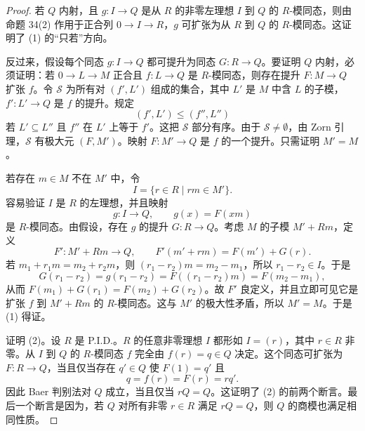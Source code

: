 \begin{proof}
若 $Q$ 内射，且 $g:I\to Q$ 是从 $R$ 的非零左理想 $I$ 到 $Q$ 的 $R$-模同态，则由命题 34(2) 作用于正合列 $0\to I\to R$，$g$ 可扩张为从 $R$ 到 $Q$ 的 $R$-模同态。这证明了 (1) 的“只若”方向。

反过来，假设每个同态 $g:I\to Q$ 都可提升为同态 $G:R\to Q$。要证明 $Q$ 内射，必须证明：若 $0\to L\to M$ 正合且 $f:L\to Q$ 是 $R$-模同态，则存在提升 $F:M\to Q$ 扩张 $f$。令 $\mathcal S$ 为所有对 $(f',L')$ 组成的集合，其中 $L'$ 是 $M$ 中含 $L$ 的子模，$f':L'\to Q$ 是 $f$ 的提升。规定
\[
(f',L')\leq(f'',L'')
\]
若 $L'\subseteq L''$ 且 $f''$ 在 $L'$ 上等于 $f'$。这把 $\mathcal S$ 部分有序。由于 $\mathcal S\neq\emptyset$，由 Zorn 引理，$\mathcal S$ 有极大元 $(F,M')$。映射 $F:M'\to Q$ 是 $f$ 的一个提升。只需证明 $M'=M$。

若存在 $m\in M$ 不在 $M'$ 中，令
\[
I=\{r\in R\mid rm\in M'\}.
\]
容易验证 $I$ 是 $R$ 的左理想，并且映射
\[
g:I\to Q,
\qquad g(x)=F(xm)
\]
是 $R$-模同态。由假设，存在 $g$ 的提升 $G:R\to Q$。考虑 $M$ 的子模 $M'+Rm$，定义
\[
F':M'+Rm\longrightarrow Q,
\qquad F'(m'+rm)=F(m')+G(r).
\]
若 $m_1+r_1m=m_2+r_2m$，则 $(r_1-r_2)m=m_2-m_1$，所以 $r_1-r_2\in I$。于是
\[
G(r_1-r_2)=g(r_1-r_2)=F((r_1-r_2)m)=F(m_2-m_1),
\]
从而 $F(m_1)+G(r_1)=F(m_2)+G(r_2)$。故 $F'$ 良定义，并且立即可见它是扩张 $f$ 到 $M'+Rm$ 的 $R$-模同态。这与 $M'$ 的极大性矛盾，所以 $M'=M$。于是 (1) 得证。

证明 (2)。设 $R$ 是 P.I.D.。$R$ 的任意非零理想 $I$ 都形如 $I=(r)$，其中 $r\in R$ 非零。从 $I$ 到 $Q$ 的 $R$-模同态 $f$ 完全由 $f(r)=q\in Q$ 决定。这个同态可扩张为 $F:R\to Q$，当且仅当存在 $q'\in Q$ 使 $F(1)=q'$ 且
\[
q=f(r)=F(r)=rq'.
\]
因此 Baer 判别法对 $Q$ 成立，当且仅当 $rQ=Q$。这证明了 (2) 的前两个断言。最后一个断言是因为，若 $Q$ 对所有非零 $r\in R$ 满足 $rQ=Q$，则 $Q$ 的商模也满足相同性质。
\end{proof}

